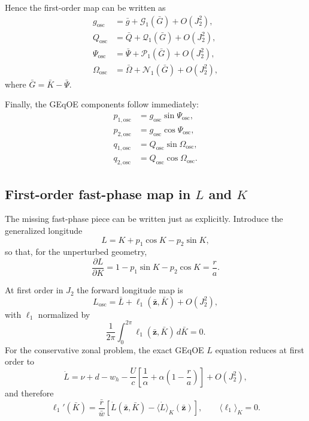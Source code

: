 \documentclass[11pt]{article}
\begin{document}
Hence the first-order map can be written as
\begin{align}
g_{\mathrm{osc}} &= \bar g + \mathcal G_1(\bar G) + O(J_2^2), \\
Q_{\mathrm{osc}} &= \bar Q + \mathcal Q_1(\bar G) + O(J_2^2), \\
\Psi_{\mathrm{osc}} &= \bar\Psi + \mathcal P_1(\bar G) + O(J_2^2), \\
\Omega_{\mathrm{osc}} &= \bar\Omega + \mathcal N_1(\bar G) + O(J_2^2),
\label{eq:explicit_map_gQPsiOmega}
\end{align}
where $\bar G = \bar K - \bar\Psi$.

Finally, the GEqOE components follow immediately:
\begin{align}
p_{1,\mathrm{osc}} &= g_{\mathrm{osc}}\sin\Psi_{\mathrm{osc}}, \\
p_{2,\mathrm{osc}} &= g_{\mathrm{osc}}\cos\Psi_{\mathrm{osc}}, \\
q_{1,\mathrm{osc}} &= Q_{\mathrm{osc}}\sin\Omega_{\mathrm{osc}}, \\
q_{2,\mathrm{osc}} &= Q_{\mathrm{osc}}\cos\Omega_{\mathrm{osc}}.
\label{eq:pq_from_map}
\end{align}

\subsection{First-order fast-phase map in \texorpdfstring{$L$}{L} and \texorpdfstring{$K$}{K}}

The missing fast-phase piece can be written just as explicitly. Introduce the
generalized longitude
\begin{equation}
L = K + p_1 \cos K - p_2 \sin K,
\label{eq:L_def}
\end{equation}
so that, for the unperturbed geometry,
\begin{equation}
\frac{\partial L}{\partial K}
= 1 - p_1 \sin K - p_2 \cos K
= \frac{r}{a}.
\label{eq:dLdK}
\end{equation}

At first order in $J_2$ the forward longitude map is
\begin{equation}
L_{\mathrm{osc}}
= \bar L + \ell_1(\bar{\bm z},\bar K) + O(J_2^2),
\label{eq:forward_map_L}
\end{equation}
with $\ell_1$ normalized by
\begin{equation}
\frac{1}{2\pi}\int_0^{2\pi}\ell_1(\bar{\bm z},\bar K)\,d\bar K = 0.
\label{eq:ell_zero_mean}
\end{equation}
For the conservative zonal problem, the exact GEqOE $L$ equation reduces at
first order to
\begin{equation}
\dot L
= \nu + d - w_h
- \frac{U}{c}\left[
\frac{1}{\alpha} + \alpha\left(1-\frac{r}{a}\right)
\right]
+ O(J_2^2),
\label{eq:Ldot_j2_first}
\end{equation}
and therefore
\begin{equation}
\ell_1'(\bar K)
= \frac{\bar r}{\bar w}
\left[
\dot L(\bar{\bm z},\bar K)
- \langle \dot L \rangle_K(\bar{\bm z})
\right],
\qquad
\langle \ell_1 \rangle_K = 0.
\label{eq:ell_prime}
\end{equation}
\end{document}
